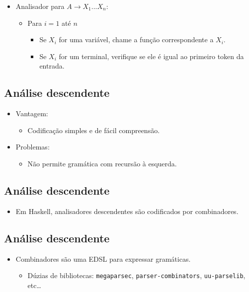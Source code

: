 \documentclass[11pt]{article}
\begin{document}
\begin{itemize}
\item Analisador para \(A \to X_1 ... X_n\):
\begin{itemize}
\item Para \(i = 1\) até \(n\)
\begin{itemize}
\item Se \(X_i\) for uma variável, chame a função correspondente a \(X_i\).
\item Se \(X_i\) for um terminal, verifique se ele é igual ao primeiro token da entrada.
\end{itemize}
\end{itemize}
\end{itemize}
\subsection*{Análise descendente}
\label{sec:org77d2b75}

\begin{itemize}
\item Vantagem:
\begin{itemize}
\item Codificação simples e de fácil compreensão.
\end{itemize}

\item Problemas:
\begin{itemize}
\item Não permite gramática com recursão à esquerda.
\end{itemize}
\end{itemize}
\subsection*{Análise descendente}
\label{sec:org3910684}

\begin{itemize}
\item Em Haskell, analisadores descendentes são codificados por combinadores.
\end{itemize}
\subsection*{Análise descendente}
\label{sec:orgf7ac51f}

\begin{itemize}
\item Combinadores são uma EDSL para expressar gramáticas.
\begin{itemize}
\item Dúzias de bibliotecas: \texttt{megaparsec}, \texttt{parser-combinators}, \texttt{uu-parselib}, etc\ldots{}
\end{itemize}
\end{itemize}
\end{document}
